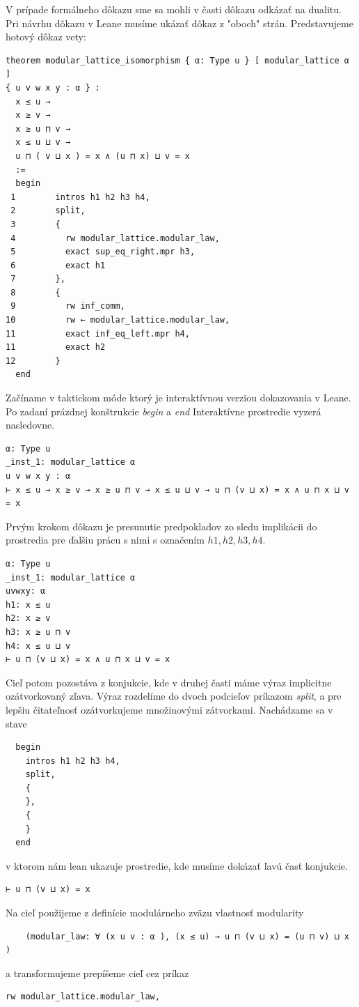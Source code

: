 \documentclass[a4paper,10pt,oneside]{report}%
\begin{document}
    V prípade formálneho dôkazu sme sa mohli v časti dôkazu odkázať na dualitu.
    Pri návrhu dôkazu v Leane musíme ukázať dôkaz z "oboch" strán. Predstavujeme
hotový dôkaz vety:
\begin{lstlisting}
theorem modular_lattice_isomorphism { α: Type u } [ modular_lattice α ]
{ u v w x y : α } :
  x ≤ u →
  x ≥ v →
  x ≥ u ⊓ v →
  x ≤ u ⊔ v →
  u ⊓ ( v ⊔ x ) = x ∧ (u ⊓ x) ⊔ v = x
  :=
  begin
 1        intros h1 h2 h3 h4,
 2        split,
 3        {
 4          rw modular_lattice.modular_law,
 5          exact sup_eq_right.mpr h3,
 6          exact h1
 7        },
 8        {
 9          rw inf_comm,
10          rw ← modular_lattice.modular_law,
11          exact inf_eq_left.mpr h4,
11          exact h2
12        }
  end
\end{lstlisting}
    Začíname v taktickom móde ktorý je interaktívnou verziou dokazovania v Leane.
    Po zadaní prázdnej konštrukcie \emph{begin} a \emph{end}
    Interaktívne prostredie vyzerá nasledovne.
\begin{lstlisting}
α: Type u
_inst_1: modular_lattice α
u v w x y : α
⊢ x ≤ u → x ≥ v → x ≥ u ⊓ v → x ≤ u ⊔ v → u ⊓ (v ⊔ x) = x ∧ u ⊓ x ⊔ v = x
\end{lstlisting}
    Prvým krokom dôkazu je presunutie predpokladov zo sledu implikácii do
prostredia pre ďalšiu prácu s nimi s označením $h1,h2,h3,h4$.
\begin{lstlisting}
α: Type u
_inst_1: modular_lattice α
uvwxy: α
h1: x ≤ u
h2: x ≥ v
h3: x ≥ u ⊓ v
h4: x ≤ u ⊔ v
⊢ u ⊓ (v ⊔ x) = x ∧ u ⊓ x ⊔ v = x
\end{lstlisting}
    Cieľ potom pozostáva z konjukcie, kde v druhej časti máme výraz implicitne
ozátvorkovaný zľava.
    Výraz rozdelíme do dvoch podcieľov príkazom \emph{split}, a pre lepšiu
čitateľnosť ozátvorkujeme množinovými zátvorkami. Nachádzame sa v stave
\begin{lstlisting}
  begin
    intros h1 h2 h3 h4,
    split,
    {
    },
    {
    }
  end
\end{lstlisting}
v ktorom nám lean ukazuje prostredie, kde musíme dokázať ľavú časť konjukcie.
\begin{lstlisting}
⊢ u ⊓ (v ⊔ x) = x
\end{lstlisting}
Na cieľ použijeme z definície modulárneho zväzu vlastnosť modularity
\begin{lstlisting}
    (modular_law: ∀ (x u v : α ), (x ≤ u) → u ⊓ (v ⊔ x) = (u ⊓ v) ⊔ x )
\end{lstlisting}
a transformujeme prepíšeme cieľ cez príkaz
\begin{lstlisting}
rw modular_lattice.modular_law,
\end{lstlisting}
\end{document}
